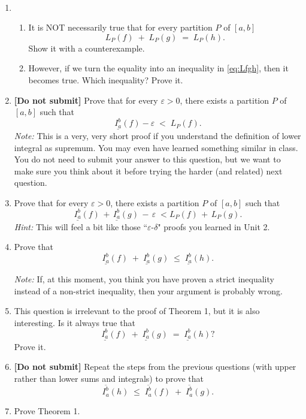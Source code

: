 \documentclass[12pt]{exam}
\newcommand{\e}{\varepsilon}
\begin{document}
\


\begin{enumerate}

\item  \begin{enumerate}
	\item It is NOT necessarily true that for every partition $P$ of $[a,b]$
		\begin{equation} \label{eq:Lfgh}
			L_{P}(f) \; + \; L_P(g) \; = \; L_P(h).
		\end{equation}
	Show it with a counterexample.
	\item 	However, if we turn the equality into an inequality in \eqref{eq:Lfgh}, then it becomes true.  Which inequality?  Prove it.
	\end{enumerate}
	
\item   {\bf [Do not submit]}  Prove that for every $\e>0$, there exists a partition $P$ of $[a,b]$ such that 
	$$
		\underline{I_a^b}(f) - \e \; < \;  L_P(f). 
	$$
	\emph{Note:}  This is a very, very short proof if you understand the definition of lower integral as supremum.  You may even have learned something similar in class.  You do not need to submit your answer to this question, but we want to make sure you think about it before trying the harder (and related) next question.

\item  Prove that for every $\e>0$, there exists a partition $P$ of $[a,b]$ such that
	$$
		\underline{I_a^b}(f) \, + \, \underline{I_a^b}(g) \, - \, \e \; < L_P(f) \, + \, L_P(g).
	$$
	\emph{Hint:}  This will feel a bit like those ``$\e$-$\delta$" proofs you learned in Unit 2.
\item Prove that
	$$
		\underline{I_a^b}(f) \; + \; \underline{I_a^b}(g) \; \leq \;  \underline{I_a^b}(h).
	$$

	\emph{Note:}  If, at this moment, you think you have proven a strict inequality instead of a non-strict inequality, then your argument is probably wrong.

\item  This question is irrelevant to the proof of Theorem 1, but it is also interesting.  Is it always true that 
	$$
		\underline{I_a^b}(f) \; + \; \underline{I_a^b}(g) \; = \; \underline{I_a^b}(h)  ?
	$$
	Prove it.
	
\item {\bf [Do not submit]}  Repeat the steps from the previous questions (with upper rather than lower sums and integrals) to prove that
	$$
		\overline{I_a^b}(h) \; \leq \; \overline{I_a^b}(f) \; + \; \overline{I_a^b}(g).
	$$

\item Prove Theorem 1.

\end{enumerate}
\end{document}
